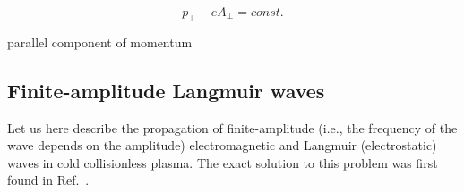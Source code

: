 \documentclass[10pt, a4paper, twoside, openright]{report}
\begin{document}
\begin{equation}\label{key}
	p_{\bot} - e A_{\bot} = const.
\end{equation}

parallel component of momentum



\subsection{Finite-amplitude Langmuir waves}
%

Let us here describe the propagation of finite-amplitude (i.e., the frequency of the wave depends on the amplitude) electromagnetic and Langmuir (electrostatic) waves in cold collisionless plasma. The exact solution to this problem was first found in Ref.~.
\end{document}

